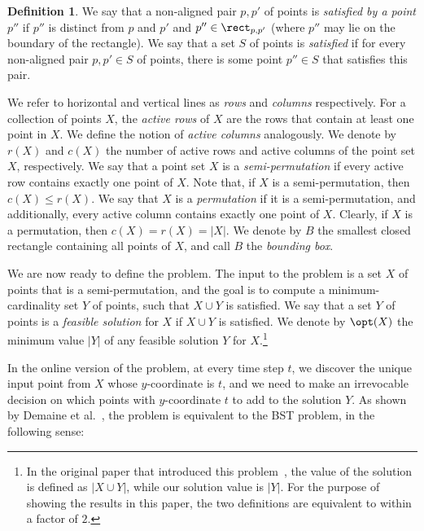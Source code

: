 \documentclass[11pt]{article}
\numberwithin{equation}{section}
\theoremstyle{definition}
\newtheorem{definition}[theorem]{Definition}
\theoremstyle{plain}
\begin{document}
	\begin{definition}
	We say that a non-aligned pair $p,p'$ of points is \emph{satisfied by a point $p''$} if $p''$ is distinct from $p$ and $p'$ and $p''\in \rect_{p,p'}$ (where $p''$ may lie on the boundary of the rectangle).
	We say that a set $S$ of points is \emph{satisfied} if for every non-aligned pair $p,p'\in S$ of points, there is some point $p''\in S$ that satisfies this pair.
	\end{definition}

	We refer to horizontal and vertical lines as \emph{rows} and \emph{columns} respectively. 
	For a collection of points $X$, the \textit{active rows} of $X$ are the rows that contain at least one point in $X$. We define the notion of \textit{active columns} analogously. 
	We denote by $r(X)$ and $c(X)$ the number of active rows and active columns of the point set $X$, respectively.
	We say that a point set $X$ is a \emph{semi-permutation} if every active row contains exactly one point of $X$.
	Note that, if $X$ is a semi-permutation, then $c(X) \le r(X)$. We say that $X$ is a \emph{permutation} if it is a semi-permutation, and additionally, every active column contains exactly one point of $X$.  
	Clearly,  if $X$ is a permutation, then $c(X)=r(X)=|X|$. 
	We denote by  $B$ the smallest closed rectangle containing all points of $X$, and call $B$ the \emph{bounding box}.
%

	We are now ready to define the  \minsat problem. 
%
%
The input to the problem is a set $X$ of points that is a semi-permutation, and the goal is to compute a minimum-cardinality set $Y$ of points, such that $X\cup Y$ is satisfied.  
	We say that a set $Y$ of points is a \emph{feasible solution} for $X$ if $X\cup Y$ is satisfied. We denote by $\opt(X)$ the minimum value $|Y|$ of any feasible solution $Y$ for $X$.\footnote{In the original paper that introduced this problem~\cite{DHIKP09}, the value of the solution is defined as $|X \cup Y|$, while our solution value is $|Y|$. For the purpose of showing the results in this paper, the two definitions are equivalent to within a factor of $2$.}
	
%
%
%
%
%
%
In the online version of the \minsat problem, at every time step $t$, we discover the unique input point from $X$ whose $y$-coordinate is $t$, and we need to make an irrevocable decision on which points with $y$-coordinate $t$ to add to the solution $Y$.
%
%
As shown by Demaine et al.~\cite{DHIKP09},
the \minsat problem is equivalent to the BST problem, in the following sense:
%
\end{document}
